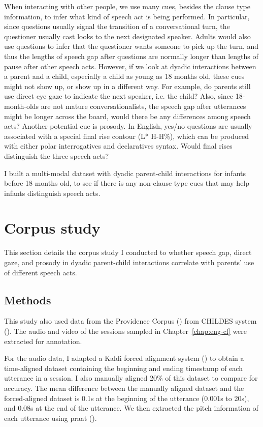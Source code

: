 When interacting with other people, we use many cues, besides the clause type information, to infer what kind of speech act is being performed. In particular, since questions usually signal the transition of a conversational turn, the questioner usually cast looks to the next designated speaker. Adults would also use questions to infer that the questioner wants someone to pick up the turn, and thus the lengths of speech gap after questions are normally longer than lengths of pause after other speech acts. However, if we look at dyadic interactions between a parent and a child, especially a child as young as 18 months old, these cues might not show up, or show up in a different way. For example, do parents still use direct eye gaze to indicate the next speaker, i.e. the child? Also, since 18-month-olds are not mature conversationalists, the speech gap after utterances might be longer across the board, would there be any differences among speech acts? Another potential cue is prosody. In English, yes/no questions are usually associated with a special final rise contour (L* H-H\%), which can be produced with either polar interrogatives and declaratives syntax. Would final rises distinguish the three speech acts?

I built a multi-modal dataset with dyadic parent-child interactions for infants before 18 months old, to see if there is any non-clause type cues that may help infants distinguish speech acts.

\section{Corpus study}
\label{sec:engsp:corpus}

This section details the corpus study I conducted to whether speech gap, direct gaze, and prosody  in dyadic parent-child interactions correlate with parents' use of different speech acts. 


\subsection{Methods}
\label{sec:engsp:corpus:method}
This study also used data from the Providence Corpus (\citealt{ProvidenceCorpus}) from CHILDES system (\citealt{CHILDES}). The audio and video of the sessions sampled in Chapter~\ref{chap:eng-cl} were extracted for annotation. 

For the audio data, I adapted a Kaldi forced alignment system (\cite{kaldi}) to obtain a time-aligned dataset containing the beginning and ending timestamp of each utterance in a session. I also manually aligned 20\% of this dataset to compare for accuracy. The mean difference between the manually aligned dataset and the forced-aligned dataset is 0.1s at the beginning of the utterance (0.001s to 20s), and 0.08s at the end of the utterance. We then extracted the pitch information of each utterance using praat (\cite{praat}). 

